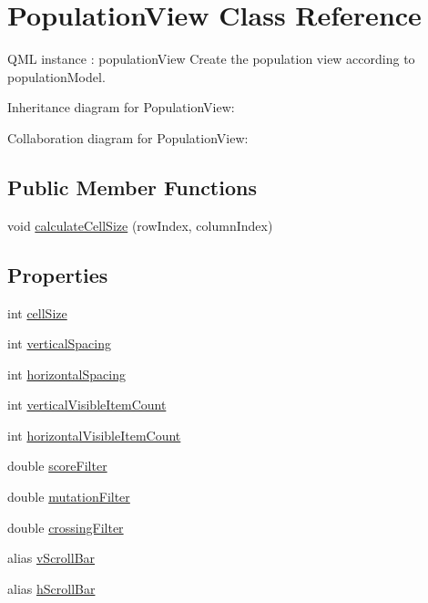 \hypertarget{class_population_view}{}\section{Population\+View Class Reference}
\label{class_population_view}


Q\+ML instance \+: population\+View Create the population view according to population\+Model.  




Inheritance diagram for Population\+View\+:


Collaboration diagram for Population\+View\+:
\subsection*{Public Member Functions}
\begin{DoxyCompactItemize}
\item 
void \hyperlink{class_population_view_ae2224014c990c0270eef8d3e58371a43}{calculate\+Cell\+Size} (row\+Index, column\+Index)
\end{DoxyCompactItemize}
\subsection*{Properties}
\begin{DoxyCompactItemize}
\item 
int \hyperlink{class_population_view_ac51944cd0ca1aa11638354eb2bd97634}{cell\+Size}
\item 
int \hyperlink{class_population_view_a2ed2b9db4c8e806fc77c2af6fb9fa164}{vertical\+Spacing}
\item 
int \hyperlink{class_population_view_ab474777ee7d05874f0454ba4a2dbb715}{horizontal\+Spacing}
\item 
int \hyperlink{class_population_view_ac7ecf41c43f3636ca4c155beea54b580}{vertical\+Visible\+Item\+Count}
\item 
int \hyperlink{class_population_view_a4fa7612ac84c844411e316609b566181}{horizontal\+Visible\+Item\+Count}
\item 
double \hyperlink{class_population_view_a4153a853e704b553c0e8dcd7ca9dbd2e}{score\+Filter}
\item 
double \hyperlink{class_population_view_a3a173e593c94e3aa1b04b7e60c914c58}{mutation\+Filter}
\item 
double \hyperlink{class_population_view_a92ef25d9785e89ae586e0e574526faa9}{crossing\+Filter}
\item 
alias \hyperlink{class_population_view_a861743ff60207556fdb76b7cb8f9f8fe}{v\+Scroll\+Bar}
\item 
alias \hyperlink{class_population_view_a5a94c9d7afc5b9ae98fba25d0951f4c0}{h\+Scroll\+Bar}
\end{DoxyCompactItemize}


